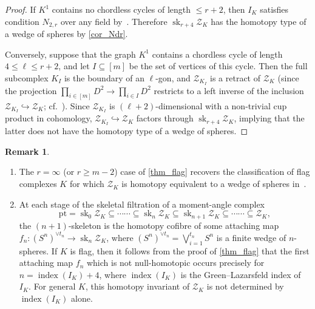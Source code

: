 \documentclass[a4paper,10pt]{amsart}
\theoremstyle{definition}
\newtheorem{remark}[theorem]{Remark}
\theoremstyle{remark}
\begin{document}
\begin{proof}
If $K^1$ contains no chordless cycles of length $\leqslant r+2$, then $I_K$ satisfies condition $N_{2,r}$ over any field by~\cite[Theorem~2.1]{EGHP}. Therefore $\operatorname{sk}_{r+4}\mathcal{Z}_K$ has the homotopy type of a wedge of spheres by \cref{cor_Ndr}.

Conversely, suppose that the graph $K^1$ contains a chordless cycle of length $4\leqslant\ell\leqslant r+2$, and let $I\subseteq[m]$ be the set of vertices of this cycle. Then the full subcomplex $K_I$ is the boundary of an $\ell$-gon, and $\mathcal{Z}_{K_I}$ is a retract of $\mathcal{Z}_K$ (since the projection $\prod_{i\in[m]}D^2 \to \prod_{i\in I}D^2$ restricts to a left inverse of the inclusion $\mathcal{Z}_{K_I} \hookrightarrow \mathcal{Z}_K$; cf.~\cite[Lemma~2.2.3]{DS}). Since $\mathcal{Z}_{K_I}$ is $(\ell+2)$-dimensional with a non-trivial cup product in cohomology, $\mathcal{Z}_{K_I} \hookrightarrow \mathcal{Z}_K$ factors through $\operatorname{sk}_{r+4}\mathcal{Z}_K$, implying that the latter does not have the homotopy type of a wedge of spheres.
\end{proof}

\begin{remark}\ 
\begin{enumerate}[label={\normalfont(\arabic*)}]
    \item The $r=\infty$ (or $r\geqslant m-2$) case of \cref{thm_flag} recovers the classification of flag complexes $K$ for which $\mathcal{Z}_K$ is homotopy equivalent to a wedge of spheres in~\cite[Theorem~4.6]{GPTW}.
    \item At each stage of the skeletal filtration of a moment-angle complex
    \[
    \mathrm{pt}=\operatorname{sk}_0\mathcal{Z}_K \subseteq\cdots\cdots\subseteq \operatorname{sk}_n\mathcal{Z}_K \subseteq \operatorname{sk}_{n+1}\mathcal{Z}_K \subseteq\cdots\cdots\subseteq \mathcal{Z}_K,
    \]
    the $(n+1)$-skeleton is the homotopy cofibre of some attaching map $f_n\colon (S^n)^{\vee t_n} \to \operatorname{sk}_n\mathcal{Z}_K$, where $(S^n)^{\vee t_n}=\bigvee_{i=1}^{t_n} S^n$ is a finite wedge of $n$-spheres. 
    If $K$ is flag, then it follows from the proof of \cref{thm_flag} that the first attaching map $f_n$ which is not null-homotopic occurs precisely for $n=\operatorname{index}(I_K)+4$, where $\operatorname{index}(I_K)$ is the Green--Lazarsfeld index of $I_K$. For general $K$, this homotopy invariant of $\mathcal{Z}_K$ is not determined by $\operatorname{index}(I_K)$ alone. 
\end{enumerate}    
\end{remark}
\end{document}
